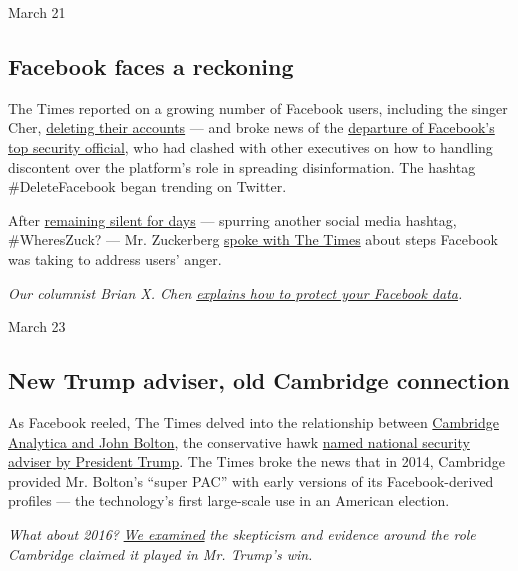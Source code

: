 March 21

\hypertarget{facebook-faces-a-reckoning}{%
\subsection{Facebook faces a
reckoning}\label{facebook-faces-a-reckoning}}

The Times reported on a growing number of Facebook users, including the
singer Cher,
\href{https://www.nytimes.com/2018/03/21/technology/users-abandon-facebook.html}{deleting
their accounts} --- and broke news of the
\href{https://www.nytimes.com/2018/03/19/technology/facebook-alex-stamos.html}{departure
of Facebook's top security official}, who had clashed with other
executives on how to handling discontent over the platform's role in
spreading disinformation. The hashtag \#DeleteFacebook began trending on
Twitter.

After
\href{https://www.nytimes.com/2018/03/21/technology/mark-zuckerberg-facebook.html}{remaining
silent for days} --- spurring another social media hashtag,
\#WheresZuck? --- Mr. Zuckerberg
\href{https://www.nytimes.com/2018/03/21/technology/mark-zuckerberg-q-and-a.html}{spoke
with The Times} about steps Facebook was taking to address users' anger.

\emph{Our columnist Brian X. Chen}
\href{https://www.nytimes.com/2018/03/19/technology/personaltech/protect-yourself-on-facebook.html}{\emph{explains
how to protect your Facebook data}}\emph{.}

March 23

\hypertarget{new-trump-adviser-old-cambridge-connection}{%
\subsection{New Trump adviser, old Cambridge
connection}\label{new-trump-adviser-old-cambridge-connection}}

As Facebook reeled, The Times delved into the relationship between
\href{https://www.nytimes.com/2018/03/23/us/politics/bolton-cambridge-analyticas-facebook-data.html}{Cambridge
Analytica and John Bolton}, the conservative hawk
\href{https://www.nytimes.com/2018/03/22/us/politics/hr-mcmaster-trump-bolton.html}{named
national security adviser by President Trump}. The Times broke the news
that in 2014, Cambridge provided Mr. Bolton's ``super PAC'' with early
versions of its Facebook-derived profiles --- the technology's first
large-scale use in an American election.

\emph{What about 2016?}
\href{https://www.nytimes.com/2017/03/06/us/politics/cambridge-analytica.html}{\emph{We
examined}} \emph{the skepticism and evidence around the role Cambridge
claimed it played in Mr. Trump's win.}

